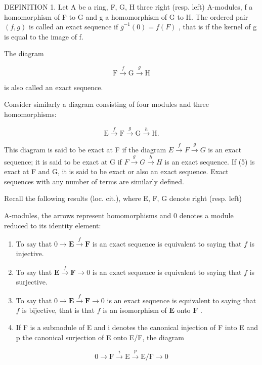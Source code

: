 DEFINITION 1. Let A be a ring, F, G, H three right (resp. left) A-modules, f a homomorphism of F to G and g a homomorphism of G to H. The ordered pair \((f, g)\) is called an exact sequence if \(\bar{g}^{-1}(0) = f(F)\) , that is if the kernel of g is equal to the image of f.

The diagram

\[
\mathrm{F} \xrightarrow {f} \mathrm{G} \xrightarrow {g} \mathrm{H}\tag{4}
\]

is also called an exact sequence.

Consider similarly a diagram consisting of four modules and three homomorphisms:

\[
\mathrm{E} \xrightarrow {f} \mathrm{F} \xrightarrow {g} \mathrm{G} \xrightarrow {h} \mathrm{H}.\tag{5}
\]

This diagram is said to be exact at F if the diagram \(E \xrightarrow{f} F \xrightarrow{g} G\) is an exact sequence; it is said to be exact at G if \(F \xrightarrow{g} G \xrightarrow{h} H\) is an exact sequence. If (5) is exact at F and G, it is said to be exact or also an exact sequence. Exact sequences with any number of terms are similarly defined.

Recall the following results (loc. cit.), where E, F, G denote right (resp. left)

A-modules, the arrows represent homomorphisms and 0 denotes a module reduced to its identity element:

\begin{enumerate}
\def\labelenumi{(\alph{enumi})}
\item
  To say that \(0 \to \mathbf{E} \xrightarrow{f} \mathbf{F}\) is an exact sequence is equivalent to saying that \(f\) is injective.
\item
  To say that \(\mathbf{E} \xrightarrow{f} \mathbf{F} \to 0\) is an exact sequence is equivalent to saying that \(f\) is surjective.
\item
  To say that \(0 \to \mathbf{E} \xrightarrow{f} \mathbf{F} \to 0\) is an exact sequence is equivalent to saying that \(f\) is bijective, that is that \(f\) is an isomorphism of \(\mathbf{E}\) onto \(\mathbf{F}\) .
\item
  If F is a submodule of E and i denotes the canonical injection of F into E and p the canonical surjection of E onto E/F, the diagram
\end{enumerate}

\[
0 \longrightarrow \mathrm{F} \stackrel {i} {\longrightarrow} \mathrm{E} \stackrel {p} {\longrightarrow} \mathrm{E} / \mathrm{F} \longrightarrow 0\tag{6}
\]

